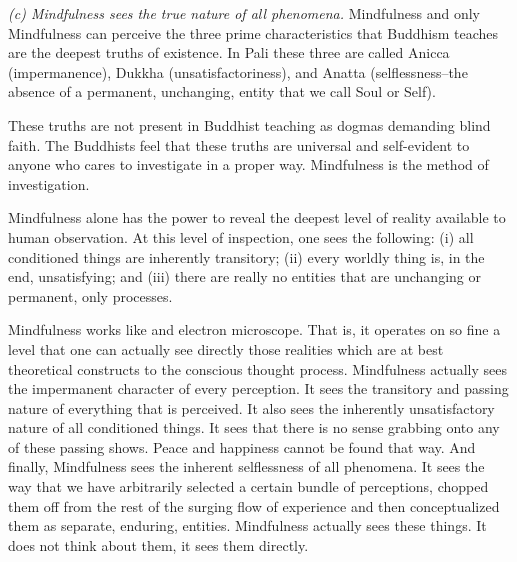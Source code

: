 \emph{(c) Mindfulness sees the true nature of all phenomena.} Mindfulness and only
Mindfulness can perceive the three prime characteristics that Buddhism teaches
are the deepest truths of existence. In Pali these three are called Anicca
(impermanence), Dukkha (unsatisfactoriness), and Anatta (selflessness--the
absence of a permanent, unchanging, entity that we call Soul or Self).

These truths are not present in Buddhist teaching as dogmas demanding blind
faith. The Buddhists feel that these truths are universal and self-evident to
anyone who cares to investigate in a proper way. Mindfulness is the method of
investigation.

Mindfulness alone has the power to reveal the deepest level of reality available
to human observation. At this level of inspection, one sees the following: (i)
all conditioned things are inherently transitory; (ii) every worldly thing is, in
the end, unsatisfying; and (iii) there are really no entities that are unchanging
or permanent, only processes.

Mindfulness works like and electron microscope. That is, it operates on so fine
a level that one can actually see directly those realities which are at best
theoretical constructs to the conscious thought process. Mindfulness actually
sees the impermanent character of every perception. It sees the transitory and
passing nature of everything that is perceived. It also sees the inherently
unsatisfactory nature of all conditioned things. It sees that there is no sense
grabbing onto any of these passing shows. Peace and happiness cannot be found
that way. And finally, Mindfulness sees the inherent selflessness of all
phenomena. It sees the way that we have arbitrarily selected a certain bundle of
perceptions, chopped them off from the rest of the surging flow of experience
and then conceptualized them as separate, enduring, entities. Mindfulness
actually sees these things. It does not think about them, it sees them directly.

